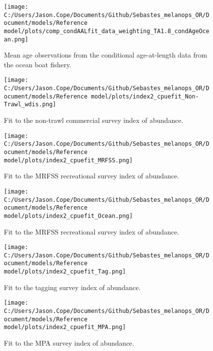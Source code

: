 \documentclass[11pt,
  english,
  letterpaper,
]{article}
\begin{document}
\begin{figure}
\centering
\texttt{[image: C:/Users/Jason.Cope/Documents/Github/Sebastes\_melanops\_OR/Document/models/Reference model/plots/comp\_condAALfit\_data\_weighting\_TA1.8\_condAgeOcean.png]}
\caption{Mean age observations from the conditional age-at-length data from the ocean boat fishery.\label{fig:ocean-mean-caal}}
\end{figure}

\begin{figure}
\centering
\texttt{[image: C:/Users/Jason.Cope/Documents/Github/Sebastes\_melanops\_OR/Document/models/Reference model/plots/index2\_cpuefit\_Non-Trawl\_wdis.png]}
\caption{Fit to the non-trawl commercial survey index of abundance.\label{fig:nontrawl-index-fit}}
\end{figure}

\begin{figure}
\centering
\texttt{[image: C:/Users/Jason.Cope/Documents/Github/Sebastes\_melanops\_OR/Document/models/Reference model/plots/index2\_cpuefit\_MRFSS.png]}
\caption{Fit to the MRFSS recreational survey index of abundance.\label{fig:mrfss-index-fit}}
\end{figure}

\begin{figure}
\centering
\texttt{[image: C:/Users/Jason.Cope/Documents/Github/Sebastes\_melanops\_OR/Document/models/Reference model/plots/index2\_cpuefit\_Ocean.png]}
\caption{Fit to the MRFSS recreational survey index of abundance.\label{fig:orbs-index-fit}}
\end{figure}

\begin{figure}
\centering
\texttt{[image: C:/Users/Jason.Cope/Documents/Github/Sebastes\_melanops\_OR/Document/models/Reference model/plots/index2\_cpuefit\_Tag.png]}
\caption{Fit to the tagging survey index of abundance.\label{fig:tag-index-fit}}
\end{figure}

\begin{figure}
\centering
\texttt{[image: C:/Users/Jason.Cope/Documents/Github/Sebastes\_melanops\_OR/Document/models/Reference model/plots/index2\_cpuefit\_MPA.png]}
\caption{Fit to the MPA survey index of abundance.\label{fig:mpa-index-fit}}
\end{figure}
\end{document}
